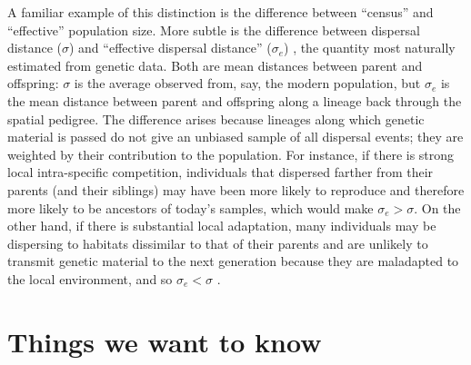 \documentclass{ar-1col}
\begin{document}
A familiar example of this distinction is the difference between ``census'' and ``effective'' population size.
More subtle is the difference between dispersal distance ($\sigma$) and
``effective dispersal distance'' ($\sigma_e$) \citep{Cayuela2018demographic},
the quantity most naturally estimated from genetic data.
Both are mean distances between parent and offspring:
$\sigma$ is the average observed from, say, the modern population,
but $\sigma_e$ is
the mean distance between parent and offspring along a lineage back through the spatial pedigree.
The difference arises because
lineages along which genetic material is passed do not give an unbiased sample of all dispersal events;
they are weighted by their contribution to the population.
For instance, if there is strong local intra-specific competition,
individuals that dispersed farther from their parents (and their siblings)
may have been more likely to reproduce and therefore more likely to be ancestors of today's samples,
which would make $\sigma_e > \sigma$.
On the other hand, if there is substantial local adaptation,
many individuals may be dispersing to habitats dissimilar to that of their parents
and are unlikely to transmit genetic material to the next generation
because they are maladapted to the local environment,
and so $\sigma_e < \sigma$
\citep[for a review, see][]{wangbradburd2014}.


\section{Things we want to know}

\end{document}
